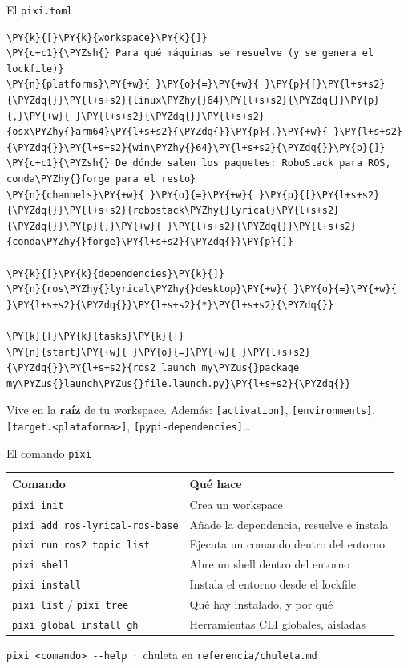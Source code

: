 \documentclass[aspectratio=169]{beamer}
\newcommand{\referencia}[1]{\vfill{\scriptsize\color{halfgray} #1}}
\begin{document}
\begin{frame}[fragile]{El \texttt{pixi.toml}}
\begin{filelisting}
\begin{Verbatim}[commandchars=\\\{\},breaklines,breakanywhere]
\PY{k}{[}\PY{k}{workspace}\PY{k}{]}
\PY{c+c1}{\PYZsh{} Para qué máquinas se resuelve (y se genera el lockfile)}
\PY{n}{platforms}\PY{+w}{ }\PY{o}{=}\PY{+w}{ }\PY{p}{[}\PY{l+s+s2}{\PYZdq{}}\PY{l+s+s2}{linux\PYZhy{}64}\PY{l+s+s2}{\PYZdq{}}\PY{p}{,}\PY{+w}{ }\PY{l+s+s2}{\PYZdq{}}\PY{l+s+s2}{osx\PYZhy{}arm64}\PY{l+s+s2}{\PYZdq{}}\PY{p}{,}\PY{+w}{ }\PY{l+s+s2}{\PYZdq{}}\PY{l+s+s2}{win\PYZhy{}64}\PY{l+s+s2}{\PYZdq{}}\PY{p}{]}
\PY{c+c1}{\PYZsh{} De dónde salen los paquetes: RoboStack para ROS, conda\PYZhy{}forge para el resto}
\PY{n}{channels}\PY{+w}{ }\PY{o}{=}\PY{+w}{ }\PY{p}{[}\PY{l+s+s2}{\PYZdq{}}\PY{l+s+s2}{robostack\PYZhy{}lyrical}\PY{l+s+s2}{\PYZdq{}}\PY{p}{,}\PY{+w}{ }\PY{l+s+s2}{\PYZdq{}}\PY{l+s+s2}{conda\PYZhy{}forge}\PY{l+s+s2}{\PYZdq{}}\PY{p}{]}

\PY{k}{[}\PY{k}{dependencies}\PY{k}{]}
\PY{n}{ros\PYZhy{}lyrical\PYZhy{}desktop}\PY{+w}{ }\PY{o}{=}\PY{+w}{ }\PY{l+s+s2}{\PYZdq{}}\PY{l+s+s2}{*}\PY{l+s+s2}{\PYZdq{}}

\PY{k}{[}\PY{k}{tasks}\PY{k}{]}
\PY{n}{start}\PY{+w}{ }\PY{o}{=}\PY{+w}{ }\PY{l+s+s2}{\PYZdq{}}\PY{l+s+s2}{ros2 launch my\PYZus{}package my\PYZus{}launch\PYZus{}file.launch.py}\PY{l+s+s2}{\PYZdq{}}
\end{Verbatim}
\end{filelisting}
\vfill
Vive en la \textbf{raíz} de tu workspace. Además: \lstinline|[activation]|, \lstinline|[environments]|, \lstinline|[target.<plataforma>]|, \lstinline|[pypi-dependencies]|\ldots
\end{frame}

\begin{frame}{El comando \texttt{pixi}}
\centering
\begin{tabular}{ll}
\toprule
\textbf{Comando} & \textbf{Qué hace} \\
\midrule
\lstinline|pixi init| & Crea un workspace \\
\lstinline|pixi add ros-lyrical-ros-base| & Añade la dependencia, resuelve e instala \\
\lstinline|pixi run ros2 topic list| & Ejecuta un comando dentro del entorno \\
\lstinline|pixi shell| & Abre un shell dentro del entorno \\
\lstinline|pixi install| & Instala el entorno desde el lockfile \\
\lstinline|pixi list| / \lstinline|pixi tree| & Qué hay instalado, y por qué \\
\lstinline|pixi global install gh| & Herramientas CLI globales, aisladas \\
\bottomrule
\end{tabular}
\referencia{\lstinline|pixi <comando> --help| · chuleta en \texttt{referencia/chuleta.md}}
\end{frame}
\end{document}
